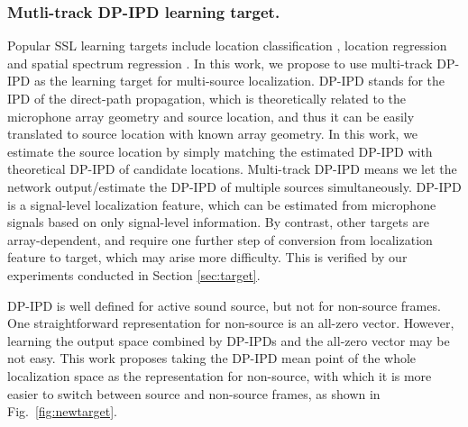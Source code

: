 \documentclass[lettersize,journal]{IEEEtran}
\begin{document}
\subsubsection{Mutli-track DP-IPD learning target.} 

Popular SSL learning targets include location classification \cite{Grumiaux2021SaladnetSM}, location regression \cite{Shimada2021MultiACCDOALA} and spatial spectrum regression \cite{He2021NeuralNA}. In this work, we propose to use multi-track DP-IPD as the learning target for multi-source localization. DP-IPD stands for the IPD of the direct-path propagation, which is theoretically related to the microphone array geometry and source location, and thus it can be easily translated to source location with known array geometry. In this work, we estimate the source location by simply matching the estimated DP-IPD with theoretical DP-IPD of candidate locations. Multi-track DP-IPD means we let the network output/estimate the DP-IPD of multiple sources simultaneously. DP-IPD is a signal-level localization feature, which can be estimated from microphone signals based on only signal-level information. By contrast, other targets are array-dependent, and require one further step of conversion from localization feature to target, which may arise more difficulty. This is verified by our experiments conducted in Section \ref{sec:target}.

DP-IPD is well defined for active sound source, but not for non-source frames. One straightforward representation for non-source is an all-zero vector. However, learning the output space combined by DP-IPDs and the all-zero vector may be not easy. This work proposes taking the DP-IPD mean point of the whole localization space as the representation for non-source, with which it is more easier to switch between source and non-source frames, as shown in Fig.~\ref{fig:newtarget}. 
\end{document}
